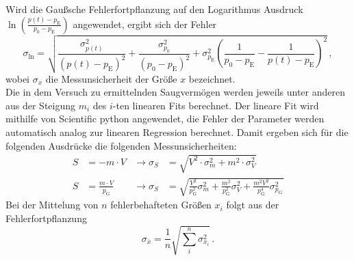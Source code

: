 \noindent Wird die Gaußsche Fehlerfortpflanzung auf den Logarithmus Ausdruck $\ln\left(\frac{p(t) - p_\text{E}}{p_0 - p_\text{E}}\right)$ angewendet, 
ergibt sich der Fehler 
\begin{equation}
    \sigma_{\ln} =\sqrt{\frac{\sigma^2_{p(t)}}{\left(p(t) - p_\text{E}\right)^2} + \frac{\sigma^2_{p_0}}{\left(p_0 - p_\text{E}\right)^2} 
                    + \sigma^2_{p_\text{E}} \left(\frac{1}{p_0 - p_\text{E}} - \frac{1}{p(t) - p_\text{E}}\right)^2 }\, , 
    \label{eqn:err_ln}
\end{equation}
wobei $\sigma_x$ die Messunsicherheit der Größe $x$ bezeichnet.\\
Die in dem Versuch zu ermittelnden Saugvermögen werden jeweils unter anderen aus der Steigung $m_i$ des $i$-ten linearen Fits berechnet. 
Der lineare Fit wird mithilfe von Scientific python \cite{numpy} angewendet, die Fehler der Parameter werden automatisch analog zur linearen Regression berechnet. 
Damit ergeben sich für die folgenden Ausdrücke die folgenden Messunsicherheiten:
\begin{align}
    S &= - m \cdot V & \rightarrow \sigma_S &= \sqrt{V^2\cdot \sigma_m^2 + m^2 \cdot \sigma_V^2} \label{eqn:err_saug_eva}\\
    S &= \frac{m\cdot V}{p_\text{G}} & \rightarrow \sigma_S &= \sqrt{\frac{V^2}{p_\text{G}^2} \sigma_m^2 + \frac{m^2}{p_\text{G}^2} \sigma_V^2 + \frac{m^2V^2}{p_\text{G}^4} \sigma_{p_{\text{G}}}^2 } \label{eqn:err_saug_leck}
\end{align}
Bei der Mittelung von $n$ fehlerbehafteten Größen $x_i$ folgt aus der Fehlerfortpflanzung
\begin{equation}
    \sigma_{\bar{x}} = \frac{1}{n} \sqrt{ \sum_i^n\sigma_{x_i}^2 }\, .
    \label{eqn:err_anderer_fehler}
\end{equation}